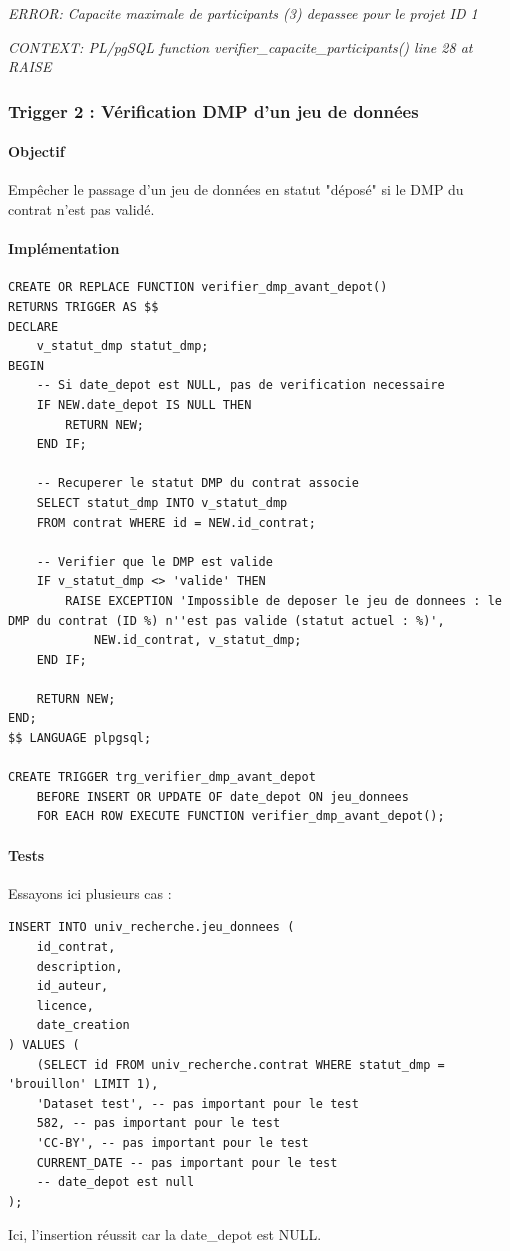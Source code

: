 \documentclass[12pt,a4paper]{article}
\begin{document}
\textit{ERROR:  Capacite maximale de participants (3) depassee pour le projet ID 1}

\textit{CONTEXT:  PL/pgSQL function verifier\_capacite\_participants() line 28 at RAISE }

\subsubsection{Trigger 2 : Vérification DMP d'un jeu de données}

\paragraph{Objectif}
Empêcher le passage d'un jeu de données en statut "déposé" si le DMP du contrat n'est pas validé.

\paragraph{Implémentation}
\begin{lstlisting}[style=sqlstyle, caption=Trigger vérification DMP]
CREATE OR REPLACE FUNCTION verifier_dmp_avant_depot()
RETURNS TRIGGER AS $$
DECLARE
    v_statut_dmp statut_dmp;
BEGIN
    -- Si date_depot est NULL, pas de verification necessaire
    IF NEW.date_depot IS NULL THEN
        RETURN NEW;
    END IF;
    
    -- Recuperer le statut DMP du contrat associe
    SELECT statut_dmp INTO v_statut_dmp
    FROM contrat WHERE id = NEW.id_contrat;
    
    -- Verifier que le DMP est valide
    IF v_statut_dmp <> 'valide' THEN
        RAISE EXCEPTION 'Impossible de deposer le jeu de donnees : le DMP du contrat (ID %) n''est pas valide (statut actuel : %)', 
            NEW.id_contrat, v_statut_dmp;
    END IF;
    
    RETURN NEW;
END;
$$ LANGUAGE plpgsql;

CREATE TRIGGER trg_verifier_dmp_avant_depot
    BEFORE INSERT OR UPDATE OF date_depot ON jeu_donnees
    FOR EACH ROW EXECUTE FUNCTION verifier_dmp_avant_depot();
\end{lstlisting}

\paragraph{Tests}
Essayons ici plusieurs cas :

\begin{lstlisting}[style=sqlstyle, caption=Test réussi du trigger vérification DMP]
INSERT INTO univ_recherche.jeu_donnees (
    id_contrat, 
    description, 
    id_auteur, 
    licence, 
    date_creation
) VALUES (
    (SELECT id FROM univ_recherche.contrat WHERE statut_dmp = 'brouillon' LIMIT 1),
    'Dataset test', -- pas important pour le test
    582, -- pas important pour le test
    'CC-BY', -- pas important pour le test
    CURRENT_DATE -- pas important pour le test
    -- date_depot est null
);
\end{lstlisting}
Ici, l'insertion réussit car la date\_depot est NULL.
\end{document}
